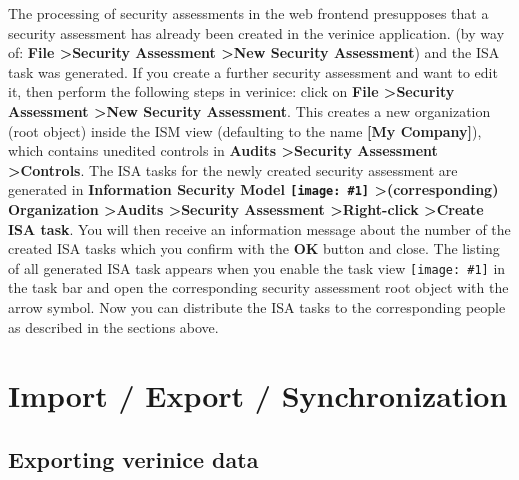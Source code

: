 \documentclass[a4paper,10pt]{book}
\newcommand{\icon}[1]{\texttt{[image: \#1]}}
\begin{document}
The processing of security assessments in the web frontend presupposes that a security assessment has already been created in the verinice application.
(by way of: \textbf{File \textgreater Security Assessment \textgreater New Security Assessment}) and the ISA task was generated. If you create a further security assessment
and want to edit it, then perform the following steps in verinice: click on  \textbf{File \textgreater Security Assessment \textgreater New Security Assessment}.
This creates a new organization (root object) inside the ISM view (defaulting to the name \textbf{[My Company]}),
which contains unedited controls in \textbf{Audits \textgreater Security Assessment \textgreater Controls}.
The ISA tasks for the newly created security assessment are generated in \textbf{Information Security Model
\icon{Icon/Informationssicherheitsmodell.png} \textgreater (corresponding) Organization \textgreater Audits \textgreater Security Assessment \textgreater Right-click \textgreater Create ISA task}.
You will then receive an information message about the number of the created ISA tasks which you confirm with the \textbf{OK} button and close.
The listing of all generated ISA task appears when you enable the task view \icon{Icon/Tasks.png} in the task bar and open the corresponding security assessment root object with the arrow symbol.
Now you can distribute the ISA tasks to the corresponding people as described in the sections above.

\chapter{Import / Export / Synchronization}
\section{Exporting verinice data}
\label{sec:exporting-verinice-data}
\end{document}
